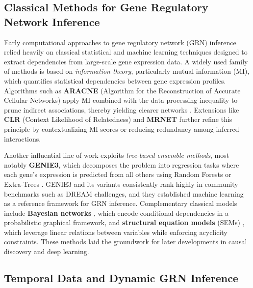 \documentclass[
]{article}
\theoremstyle{definition}
\theoremstyle{remark}
\begin{document}
\subsection{Classical Methods for Gene Regulatory Network
Inference}\label{classical-methods-for-gene-regulatory-network-inference}

Early computational approaches to gene regulatory network (GRN)
inference relied heavily on classical statistical and machine learning
techniques designed to extract dependencies from large-scale gene
expression data. A widely used family of methods is based on
\emph{information theory}, particularly mutual information (MI), which
quantifies statistical dependencies between gene expression profiles.
Algorithms such as \textbf{ARACNE} (Algorithm for the Reconstruction of
Accurate Cellular Networks) apply MI combined with the data processing
inequality to prune indirect associations, thereby yielding clearer
networks . Extensions like
\textbf{CLR} (Context Likelihood of Relatedness)
 and \textbf{MRNET}
 further refine this principle by
contextualizing MI scores or reducing redundancy among inferred
interactions.

Another influential line of work exploits \emph{tree-based ensemble
methods}, most notably \textbf{GENIE3}, which decomposes the problem
into regression tasks where each gene's expression is predicted from all
others using Random Forests or Extra-Trees
. GENIE3 and its variants
consistently rank highly in community benchmarks such as DREAM
challenges, and they established machine learning as a reference
framework for GRN inference. Complementary classical models include
\textbf{Bayesian networks} , which
encode conditional dependencies in a probabilistic graphical framework,
and \textbf{structural equation models} (SEMs)
, which leverage linear relations
between variables while enforcing acyclicity constraints. These methods
laid the groundwork for later developments in causal discovery and deep
learning.

\subsection{Temporal Data and Dynamic GRN
Inference}\label{temporal-data-and-dynamic-grn-inference}
\end{document}
